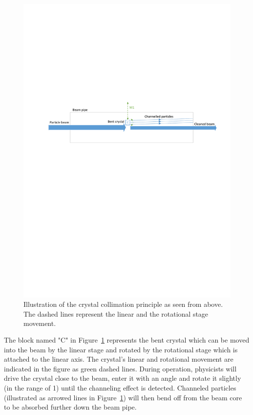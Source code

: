\begin{figure}[h!]
  \centering %
  \includegraphics[width=1\textwidth, trim= 2cm 15.5cm 1cm 10cm, clip=true]{fig/matlab/collimation}
  \caption{\label{fig:collimation}Illustration of the crystal collimation principle as seen from above. The dashed lines represent the linear and the rotational stage movement.}
\end{figure}

The block named "C" in Figure~\ref{fig:collimation} represents the bent crystal which can be moved into the beam by the linear stage and rotated by the rotational stage which is attached to the linear axis. The crystal's linear and rotational movement are indicated in the figure as green dashed lines. During operation, physicists will drive the crystal close to the beam, enter it with an angle and rotate it slightly (in the range of \unit{1}{\milli\rad}) until the channeling effect is detected. Channeled particles (illustrated as arrowed lines in Figure~\ref{fig:collimation}) will then bend off from the beam core to be absorbed further down the beam pipe.

